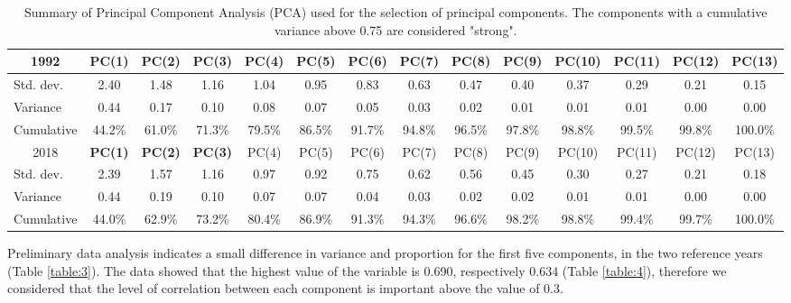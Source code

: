 \begin{table}[!ht]
	\centering
	\fontsize{5.7}{6.6} \selectfont
	\begin{tabular}{ cccccccccccccc }
		\toprule
		1992                             & {\color{orange}\textbf{PC(1)}}  & {\color{orange}\textbf{PC(2)}}  & {\color{orange}\textbf{PC(3)}}  & PC(4)  & PC(5)  & PC(6)  & PC(7)  & PC(8)  & PC(9)  & PC(10) & PC(11) & PC(12) & PC(13)  \\
		\midrule
		\multicolumn{1}{l}{Std. dev.}  & 2.40   & 1.48   & 1.16   & 1.04   & 0.95   & 0.83   & 0.63   & 0.47   & 0.40   & 0.37   & 0.29   & 0.21   & 0.15    \\
		\multicolumn{1}{l}{Variance}   & 0.44   & 0.17   & 0.10   & 0.08   & 0.07   & 0.05   & 0.03   & 0.02   & 0.01   & 0.01   & 0.01   & 0.00   & 0.00    \\
		\multicolumn{1}{l}{Cumulative} & 44.2\% & 61.0\% & 71.3\% & 79.5\% & 86.5\% & 91.7\% & 94.8\% & 96.5\% & 97.8\% & 98.8\% & 99.5\% & 99.8\% & 100.0\% \\

		\bottomrule
		\toprule
		2018                             & {\color{orange}\textbf{PC(1)}}  & {\color{orange}\textbf{PC(2)}}  & {\color{orange}\textbf{PC(3)}} & PC(4)  & PC(5)  & PC(6)  & PC(7)  & PC(8)  & PC(9)  & PC(10) & PC(11) & PC(12) & PC(13)  \\
		\midrule
		\multicolumn{1}{l}{Std. dev.}  & 2.39   & 1.57   & 1.16   & 0.97   & 0.92   & 0.75   & 0.62   & 0.56   & 0.45   & 0.30   & 0.27   & 0.21   & 0.18    \\
		\multicolumn{1}{l}{Variance}   & 0.44   & 0.19   & 0.10   & 0.07   & 0.07   & 0.04   & 0.03   & 0.02   & 0.02   & 0.01   & 0.01   & 0.00   & 0.00    \\
		\multicolumn{1}{l}{Cumulative} & 44.0\% & 62.9\% & 73.2\% & 80.4\% & 86.9\% & 91.3\% & 94.3\% & 96.6\% & 98.2\% & 98.8\% & 99.4\% & 99.7\% & 100.0\% \\
		\bottomrule
	\end{tabular}
	\caption{Summary of Principal Component Analysis (PCA) used for the selection of principal components. The  components with a cumulative variance above 0.75 are considered "strong".}
	\label{table:2}
\end{table}

Preliminary data analysis indicates a small difference in variance and proportion for the first five components, in the two reference years (Table \ref{table:3}). The data showed that the highest value of the variable is 0.690, respectively 0.634 (Table \ref{table:4}), therefore we considered that the level of correlation between each component is important above the value of 0.3.

